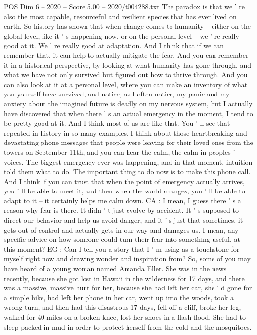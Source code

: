 \begin{textsample}{POS Dim 6 – 2020 – Score 5.00 – 2020/t004288.txt}
The paradox is that we ' re also the most capable, resourceful and resilient species that has ever lived on earth.
So history has shown that when change comes to humanity -- either on the global level, like it ' s happening now, or on the personal level -- we ' re really good at it.
We ' re really good at adaptation.
And I think that if we can remember that, it can help to actually mitigate the fear.
And you can remember it in a historical perspective, by looking at what humanity has gone through, and what we have not only survived but figured out how to thrive through.
And you can also look at it at a personal level, where you can make an inventory of what you yourself have survived, and notice, as I often notice, my panic and my anxiety about the imagined future is deadly on my nervous system, but I actually have discovered that when there ' s an actual emergency in the moment, I tend to be pretty good at it.
And I think most of us are like that.
You ' ll see that repeated in history in so many examples.
I think about those heartbreaking and devastating phone messages that people were leaving for their loved ones from the towers on September 11th, and you can hear the calm, the calm in peoples ' voices.
The biggest emergency ever was happening, and in that moment, intuition told them what to do.
The important thing to do now is to make this phone call.
And I think if you can trust that when the point of emergency actually arrives, you ' ll be able to meet it, and then when the world changes, you ' ll be able to adapt to it -- it certainly helps me calm down.
CA : I mean, I guess there ' s a reason why fear is there.
It didn ' t just evolve by accident.
It ' s supposed to direct our behavior and help us avoid danger, and it ' s just that sometimes, it gets out of control and actually gets in our way and damages us.
I mean, any specific advice on how someone could turn their fear into something useful, at this moment?
EG : Can I tell you a story that I ' m using as a touchstone for myself right now and drawing wonder and inspiration from?
So, some of you may have heard of a young woman named Amanda Eller.
She was in the news recently, because she got lost in Hawaii in the wilderness for 17 days, and there was a massive, massive hunt for her, because she had left her car, she ' d gone for a simple hike, had left her phone in her car, went up into the woods, took a wrong turn, and then had this disastrous 17 days, fell off a cliff, broke her leg, walked for 40 miles on a broken knee, lost her shoes in a flash flood.
She had to sleep packed in mud in order to protect herself from the cold and the mosquitoes.

\end{textsample}
